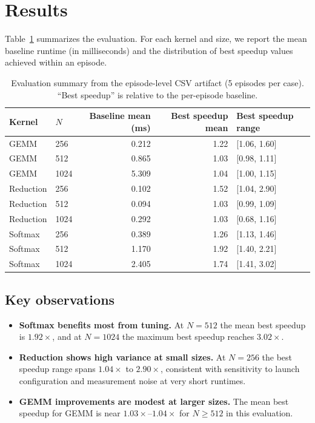\documentclass[journal,letterpaper]{IEEEtran}
\begin{document}
\section{Results}
\label{sec:results}

Table~\ref{tab:episode_results} summarizes the evaluation.
For each kernel and size, we report the mean baseline runtime (in milliseconds) and the distribution of best speedup values achieved within an episode.

\begin{table}[t]
\centering
\caption{Evaluation summary from the episode-level CSV artifact (5 episodes per case). ``Best speedup'' is relative to the per-episode baseline.}
\label{tab:episode_results}
\begin{tabular}{llrrl}
\toprule
Kernel & $N$ & Baseline mean (ms) & Best speedup mean & Best speedup range \\
\midrule
GEMM & 256 & 0.212 & 1.22 & [1.06, 1.60] \\
GEMM & 512 & 0.865 & 1.03 & [0.98, 1.11] \\
GEMM & 1024 & 5.309 & 1.04 & [1.00, 1.15] \\
Reduction & 256 & 0.102 & 1.52 & [1.04, 2.90] \\
Reduction & 512 & 0.094 & 1.03 & [0.99, 1.09] \\
Reduction & 1024 & 0.292 & 1.03 & [0.68, 1.16] \\
Softmax & 256 & 0.389 & 1.26 & [1.13, 1.46] \\
Softmax & 512 & 1.170 & 1.92 & [1.40, 2.21] \\
Softmax & 1024 & 2.405 & 1.74 & [1.41, 3.02] \\
\bottomrule
\end{tabular}
\end{table}

\subsection{Key observations}
\begin{itemize}
\item \textbf{Softmax benefits most from tuning.} At $N{=}512$ the mean best speedup is $1.92\times$, and at $N{=}1024$ the maximum best speedup reaches $3.02\times$.
\item \textbf{Reduction shows high variance at small sizes.} At $N{=}256$ the best speedup range spans $1.04\times$ to $2.90\times$, consistent with sensitivity to launch configuration and measurement noise at very short runtimes.
\item \textbf{GEMM improvements are modest at larger sizes.} The mean best speedup for GEMM is near $1.03\times$--$1.04\times$ for $N\ge512$ in this evaluation.
\end{itemize}
\end{document}
